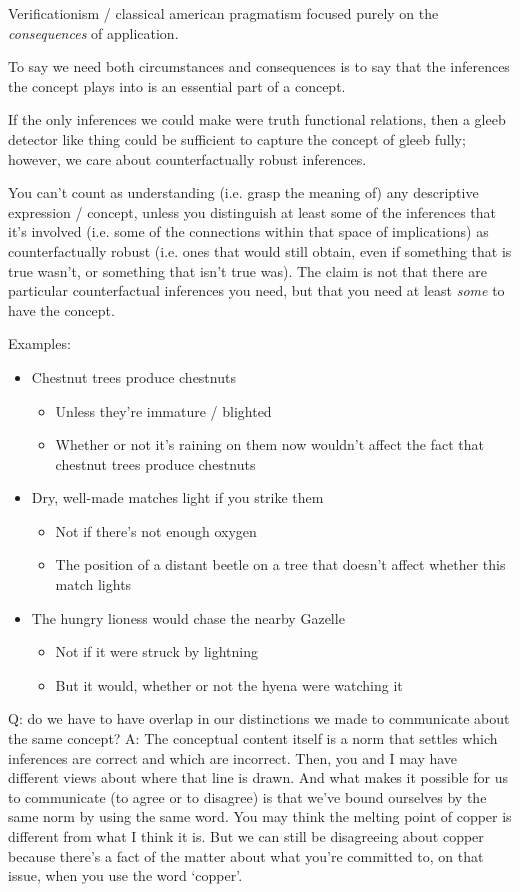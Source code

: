 Verificationism / classical american pragmatism focused purely on the \emph{consequences} of application.

To say we need both circumstances and consequences is to say that the inferences the concept plays into is an essential part of a concept.

If the only inferences we could make were truth functional relations, then a gleeb detector like thing could be sufficient to capture the concept of gleeb fully; however, we care about counterfactually robust inferences.

You can't count as understanding (i.e. grasp the meaning of) any descriptive expression / concept, unless you distinguish at least some of the inferences that it's involved (i.e. some of the connections within that space of implications) as counterfactually robust (i.e. ones that would still obtain, even if something that is true wasn't, or something that isn't true was). The claim is not that there are particular counterfactual inferences you need, but that you need at least \emph{some} to have the concept.

Examples:
\begin{itemize}
\item Chestnut trees produce chestnuts
\begin{itemize}
\item Unless they're immature / blighted
\item Whether or not it's raining on them now wouldn't affect the fact that chestnut trees produce chestnuts
\end{itemize}
\item Dry, well-made matches light if you strike them
\begin{itemize}
\item Not if there's not enough oxygen
\item The position of a distant beetle on a tree that doesn't affect whether this match lights
\end{itemize}
\item The hungry lioness would chase the nearby Gazelle
\begin{itemize}
\item Not if it were struck by lightning
\item But it would, whether or not the hyena were watching it
\end{itemize}
\end{itemize}

Q: do we have to have overlap in our distinctions we made to communicate about the same concept?
A: The conceptual content itself is a norm that settles which inferences are correct and which are incorrect. Then, you and I may have different views about where that line is drawn. And what makes it possible for us to communicate (to agree or to disagree) is that we've bound ourselves by the same norm by using the same word. You may think the melting point of copper is different from what I think it is. But we can still be disagreeing about copper because there's a fact of the matter about what you're committed to, on that issue, when you use the word `copper'.

